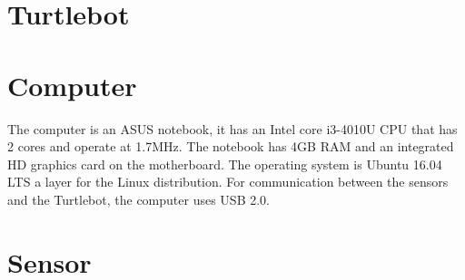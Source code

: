 \label{ch:Implementationtheory}

\section{Turtlebot} %

\su
\section{Computer} 
The computer is an ASUS notebook, it has an Intel core i3-4010U CPU that has 2 cores and operate at 1.7MHz\cite{CPU}. The notebook has 4GB RAM and an integrated HD graphics card on the motherboard\cite{ASUS}.
The operating system is Ubuntu 16.04 LTS a layer for the Linux distribution. For communication between the sensors and the Turtlebot, the computer uses USB 2.0.

\section{Sensor}
